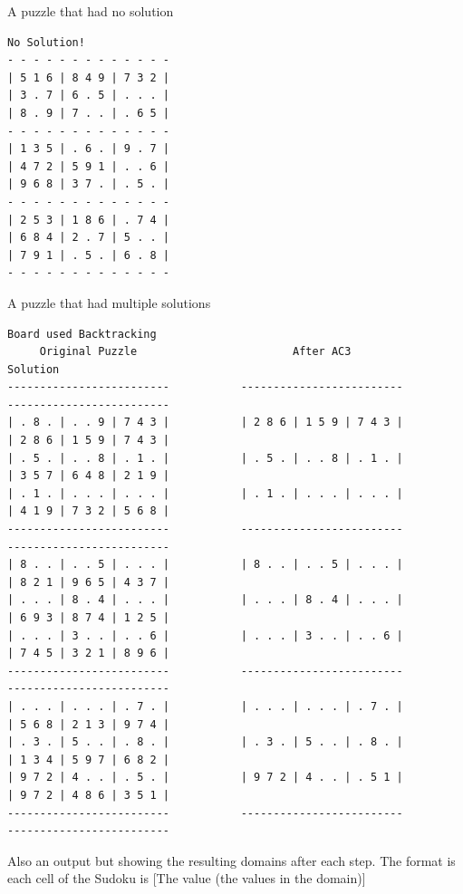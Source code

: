 \documentclass{article}
\begin{document}
A puzzle that had no solution
\begin{verbatim}
No Solution!
- - - - - - - - - - - - - 
| 5 1 6 | 8 4 9 | 7 3 2 |
| 3 . 7 | 6 . 5 | . . . |
| 8 . 9 | 7 . . | . 6 5 |
- - - - - - - - - - - - -
| 1 3 5 | . 6 . | 9 . 7 |
| 4 7 2 | 5 9 1 | . . 6 |
| 9 6 8 | 3 7 . | . 5 . | 
- - - - - - - - - - - - - 
| 2 5 3 | 1 8 6 | . 7 4 | 
| 6 8 4 | 2 . 7 | 5 . . |
| 7 9 1 | . 5 . | 6 . 8 |
- - - - - - - - - - - - -
\end{verbatim}
A puzzle that had multiple solutions
\begin{verbatim}
Board used Backtracking
     Original Puzzle                        After AC3                           Solution
-------------------------           -------------------------           -------------------------
| . 8 . | . . 9 | 7 4 3 |           | 2 8 6 | 1 5 9 | 7 4 3 |           | 2 8 6 | 1 5 9 | 7 4 3 |
| . 5 . | . . 8 | . 1 . |           | . 5 . | . . 8 | . 1 . |           | 3 5 7 | 6 4 8 | 2 1 9 |
| . 1 . | . . . | . . . |           | . 1 . | . . . | . . . |           | 4 1 9 | 7 3 2 | 5 6 8 |
-------------------------           -------------------------           -------------------------
| 8 . . | . . 5 | . . . |           | 8 . . | . . 5 | . . . |           | 8 2 1 | 9 6 5 | 4 3 7 |
| . . . | 8 . 4 | . . . |           | . . . | 8 . 4 | . . . |           | 6 9 3 | 8 7 4 | 1 2 5 | 
| . . . | 3 . . | . . 6 |           | . . . | 3 . . | . . 6 |           | 7 4 5 | 3 2 1 | 8 9 6 | 
-------------------------           -------------------------           -------------------------
| . . . | . . . | . 7 . |           | . . . | . . . | . 7 . |           | 5 6 8 | 2 1 3 | 9 7 4 |
| . 3 . | 5 . . | . 8 . |           | . 3 . | 5 . . | . 8 . |           | 1 3 4 | 5 9 7 | 6 8 2 |
| 9 7 2 | 4 . . | . 5 . |           | 9 7 2 | 4 . . | . 5 1 |           | 9 7 2 | 4 8 6 | 3 5 1 |
-------------------------           -------------------------           -------------------------
\end{verbatim}
\newpage
Also an output but showing the resulting domains after each step.
The format is each cell of the Sudoku is [The value (the values in the domain)]
\addtolength{\oddsidemargin}{-0.7in}
\end{document}
